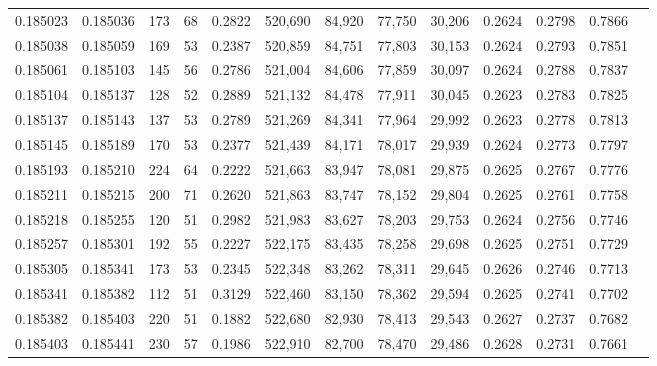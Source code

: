 \begin{tabular}{rrrrrrrrrrrrr}
0.185023 & 0.185036 &   173 &  68 &                                     0.2822 & 520,690 &  84,920 &  77,750 &  30,206 & 0.2624 & 0.2798 & 0.7866 \\
0.185038 & 0.185059 &   169 &  53 &                                     0.2387 & 520,859 &  84,751 &  77,803 &  30,153 & 0.2624 & 0.2793 & 0.7851 \\
0.185061 & 0.185103 &   145 &  56 &                                     0.2786 & 521,004 &  84,606 &  77,859 &  30,097 & 0.2624 & 0.2788 & 0.7837 \\
0.185104 & 0.185137 &   128 &  52 &                                     0.2889 & 521,132 &  84,478 &  77,911 &  30,045 & 0.2623 & 0.2783 & 0.7825 \\
0.185137 & 0.185143 &   137 &  53 &                                     0.2789 & 521,269 &  84,341 &  77,964 &  29,992 & 0.2623 & 0.2778 & 0.7813 \\
0.185145 & 0.185189 &   170 &  53 &                                     0.2377 & 521,439 &  84,171 &  78,017 &  29,939 & 0.2624 & 0.2773 & 0.7797 \\
0.185193 & 0.185210 &   224 &  64 &                                     0.2222 & 521,663 &  83,947 &  78,081 &  29,875 & 0.2625 & 0.2767 & 0.7776 \\
0.185211 & 0.185215 &   200 &  71 &                                     0.2620 & 521,863 &  83,747 &  78,152 &  29,804 & 0.2625 & 0.2761 & 0.7758 \\
0.185218 & 0.185255 &   120 &  51 &                                     0.2982 & 521,983 &  83,627 &  78,203 &  29,753 & 0.2624 & 0.2756 & 0.7746 \\
0.185257 & 0.185301 &   192 &  55 &                                     0.2227 & 522,175 &  83,435 &  78,258 &  29,698 & 0.2625 & 0.2751 & 0.7729 \\
0.185305 & 0.185341 &   173 &  53 &                                     0.2345 & 522,348 &  83,262 &  78,311 &  29,645 & 0.2626 & 0.2746 & 0.7713 \\
0.185341 & 0.185382 &   112 &  51 &                                     0.3129 & 522,460 &  83,150 &  78,362 &  29,594 & 0.2625 & 0.2741 & 0.7702 \\
0.185382 & 0.185403 &   220 &  51 &                                     0.1882 & 522,680 &  82,930 &  78,413 &  29,543 & 0.2627 & 0.2737 & 0.7682 \\
0.185403 & 0.185441 &   230 &  57 &                                     0.1986 & 522,910 &  82,700 &  78,470 &  29,486 & 0.2628 & 0.2731 & 0.7661 \\

\end{tabular}
